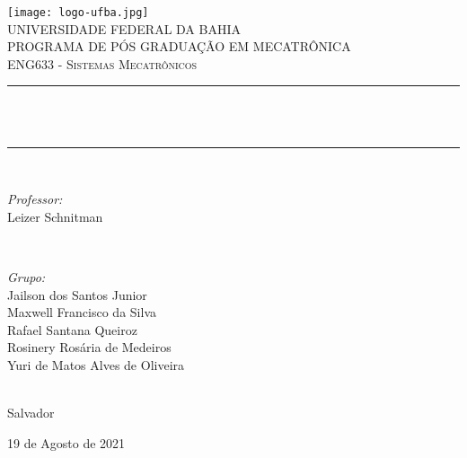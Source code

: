 \begin{titlepage}
	\centering
	\texttt{[image: logo-ufba.jpg]}\\[0.5 cm]	%
	\textsc{\LARGE UNIVERSIDADE FEDERAL DA BAHIA}\\[0.5 cm]	%
	\textsc{\large PROGRAMA DE PÓS GRADUAÇÃO EM MECATRÔNICA}\\[1 cm]
	\textsc{\Large ENG633 - Sistemas Mecatrônicos}\\[0.5 cm]				%
	\rule{\linewidth}{0.2 mm} \\
	{ \huge \bfseries \thetitle}\\
	\rule{\linewidth}{0.2 mm} \\[1 cm]
	
	\begin{minipage}{0.5\textwidth}
		\begin{flushleft} \large
			\emph{Professor:}\\
			Leizer Schnitman\\
		\end{flushleft}
	\end{minipage}~
	\begin{minipage}{0.5\textwidth}
		
		\begin{flushright} \large
			\emph{Grupo:} \\
			Jailson dos Santos Junior\\
			Maxwell Francisco da Silva\\
			Rafael Santana Queiroz\\
			Rosinery Rosária de Medeiros\\
			Yuri de Matos Alves de Oliveira
		\end{flushright}
		
	\end{minipage}\\[1.0 cm]
	
	
	Salvador
	
	19 de Agosto de 2021
	
	
	
	
\end{titlepage}